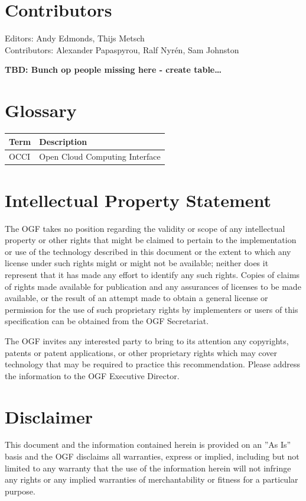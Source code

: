 \documentclass[10pt,a4paper]{article}
\begin{document}
\section{Contributors}
Editors: Andy Edmonds, Thijs Metsch \\
Contributors: Alexander Papaspyrou, Ralf Nyrén, Sam Johnston

\textbf{TBD: Bunch op people missing here - create table\ldots}

\section{Glossary}

\begin{tabular}{l|l}
Term & Description \\
\hline
OCCI & Open Cloud Computing Interface \\
\end{tabular}

\section{Intellectual Property Statement}

The OGF takes no position regarding the validity or scope of any intellectual property or other rights that might be claimed to pertain to the implementation or use of the technology described in this document or the extent to which any license under such rights might or might not be available; neither does it represent that it has made any effort to identify any such rights. Copies of claims of rights made available for publication and any assurances of licenses to be made available, or the result of an attempt made to obtain a general license or permission for the use of such proprietary rights by implementers or users of this specification can be obtained from the OGF Secretariat.

The OGF invites any interested party to bring to its attention any copyrights, patents or patent applications, or other proprietary rights which may cover technology that may be required to practice this recommendation. Please address the information to the OGF Executive Director.

\section{Disclaimer}

This document and the information contained herein is provided on an ''As Is'' basis and the OGF disclaims all warranties, express or implied, including but not limited to any warranty that the use of the information herein will not infringe any rights or any implied warranties of merchantability or fitness for a particular purpose.
\end{document}
